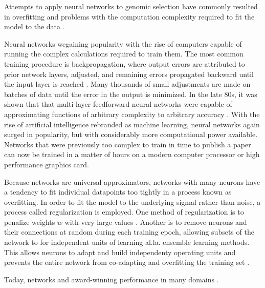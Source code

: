 \documentclass[9pt,twocolumn,twoside]{g3_article/gsag3jnl}
\begin{document}
Attempts to apply neural networks to genomic selection have commonly resulted
in overfitting and problems with the computation complexity required to 
fit the model to the data \citep{heslot2012, gonzalez-recio2014}.


Neural networks wegaining popularity with the rise of computers capable of
running the complex calculations required to train them. The most
common training procedure is backpropagation, where output errors are attributed
to prior network layers, adjusted, and remaining errors propagated backward
until the input layer is reached \citep{rumelhart1986}. Many thousands of small 
adjustments are made on batches of data until the error in the output is 
minimized. In the late 80s, it was shown that that multi-layer feedforward 
neural networks were capable of approximating functions of arbitrary complexity to 
arbitrary accuracy \citep{hornik1989}. With the rise of artificial intelligence
rebranded as machine learning, neural networks again surged in popularity,
but with considerably more computational power available. Networks that were
previously too complex to train in time to publish a paper can now be trained in
a matter of hours on a modern computer processor or high performance graphics card. 

Because networks are universal approximators, networks with many
neurons have a tendency to fit individual datapoints too tightly 
in a process known as overfitting. In order to fit the model to the underlying
sigmal rather than noise, a process called regularization is employed. One method
of regularization is to penalize weights $w$ with very large values \citep{krogh1992}. 
Another is to remove neurons and their connections at random during each training
epoch, allowing subsets of the network to for independent units of learning al.la. ensemble learning methods.  
This allows neurons to adapt and build independenty operating units and prevents the entire
network from co-adapting and overfitting the training set \citep{srivastava2014}.

Today, networks and award-winning performance in many domains \citep{schmidhuber2015}.
\end{document}
